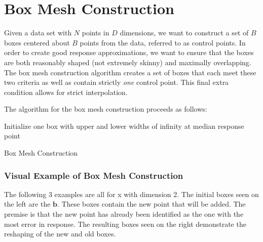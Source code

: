\documentclass[11pt,margin=1in]{article}
\begin{document}
\section{Box Mesh Construction}

Given a data set with $N$ points in $D$ dimensions, we want to
construct a set of $B$ boxes centered about $B$ points from the data,
referred to as control points. In order to create good response
approximations, we want to ensure that the boxes are both reasonably
shaped (not extremely skinny) and maximally overlapping. The box mesh
construction algorithm creates a set of boxes that each meet these two
criteria as well as contain strictly \textit{one} control point. This
final extra condition allows for strict interpolation.

The algorithm for the box mesh construction proceeds as follows:

\vspace{3mm}

\begin{algorithm}[H]
 Initialize one box with upper and lower widths of infinity at median response point\;
 \caption{Box Mesh Construction}
\end{algorithm}

\vspace{10mm}

\subsubsection*{Visual Example of Box Mesh Construction}

The following 3 examples are all for x with dimension 2. The initial
boxes seen on the left are the $\mathbf{b}$. These boxes contain the
new point that will be added. The premise is that the new point has
already been identified as the one with the most error in
response. The resulting boxes seen on the right demonstrate the
reshaping of the new and old boxes.
\end{document}
